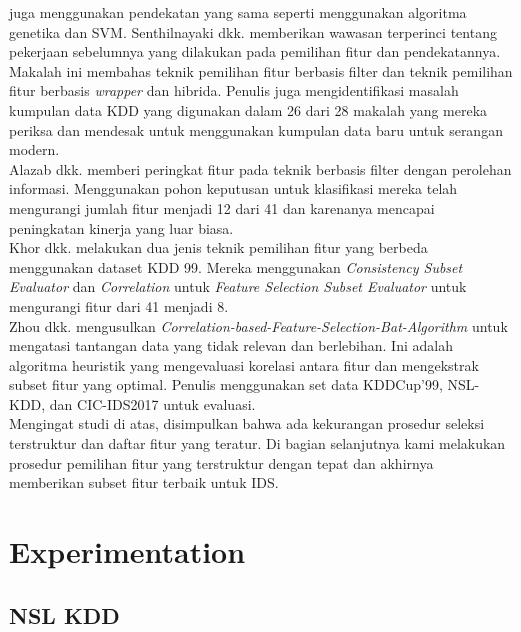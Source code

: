 \documentclass[conference]{IEEEtran}
\begin{document}
\cite{aslahi2016hybrid} juga menggunakan pendekatan yang sama seperti \cite{7881798} menggunakan algoritma genetika dan SVM.
Senthilnayaki dkk. \cite{senthilnayaki2015intrusion} memberikan wawasan terperinci tentang pekerjaan sebelumnya yang dilakukan pada pemilihan fitur dan pendekatannya. Makalah ini membahas teknik pemilihan fitur berbasis filter dan teknik pemilihan fitur berbasis \emph{wrapper} dan hibrida. Penulis juga mengidentifikasi masalah kumpulan data KDD yang digunakan dalam 26 dari 28 makalah yang mereka periksa dan mendesak untuk menggunakan kumpulan data baru untuk serangan modern.\\
Alazab dkk. \cite{alazab2012using} memberi peringkat fitur pada teknik berbasis filter dengan perolehan informasi. Menggunakan pohon keputusan untuk klasifikasi mereka telah mengurangi jumlah fitur menjadi 12 dari 41 dan karenanya mencapai peningkatan kinerja yang luar biasa.\\
Khor dkk. \cite{khor2009feature} melakukan dua jenis teknik pemilihan fitur yang berbeda menggunakan dataset KDD 99. Mereka menggunakan \emph{Consistency Subset Evaluator} dan \emph{Correlation} untuk \emph{Feature Selection Subset Evaluator} untuk mengurangi fitur dari 41 menjadi 8.\\
Zhou dkk. \cite{Zhou2020AnEN} mengusulkan \emph{Correlation-based-Feature-Selection-Bat-Algorithm} untuk mengatasi tantangan data yang tidak relevan dan berlebihan. Ini adalah algoritma heuristik yang mengevaluasi korelasi antara fitur dan mengekstrak subset fitur yang optimal. Penulis menggunakan set data KDDCup’99, NSL-KDD, dan CIC-IDS2017 untuk evaluasi.\\
Mengingat studi di atas, disimpulkan bahwa ada kekurangan prosedur seleksi terstruktur dan daftar fitur yang teratur. Di bagian selanjutnya kami melakukan prosedur pemilihan fitur yang terstruktur dengan tepat dan akhirnya memberikan subset fitur terbaik untuk IDS.

\section{Experimentation}

\subsection{NSL KDD}
\end{document}
